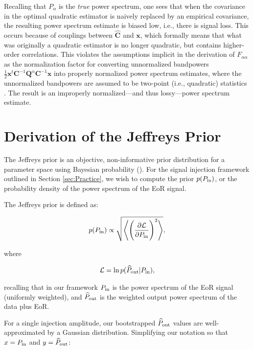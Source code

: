 \documentclass[preprint2,numberedappendix,tighten]{aastex6}  %
\newcommand{\x}{\mathbf{x}}
\newcommand{\C}{\mathbf{C}}
\newcommand{\Q}{\mathbf{Q}}
\begin{document}
Recalling that $P_\alpha$ is the \emph{true} power spectrum, one sees that when the covariance in the optimal quadratic estimator is naively replaced by an empirical covariance, the resulting power spectrum estimate is biased low, i.e., there is signal loss. This occurs because of couplings between $\widehat{\C}$ and $\x$, which formally means that what was originally a quadratic estimator is no longer quadratic, but contains higher-order correlations. This violates the assumptions implicit in the derivation of $F_{\alpha \alpha}$ as the normalization factor for converting unnormalized bandpowers $\frac{1}{2} \x^t \C^{-1} \Q^{\alpha} \C^{-1} \x$ into properly normalized power spectrum estimates, where the unnormalized bandpowers are assumed to be two-point (i.e., quadratic) statistics \citep{liu_tegmark2011}. The result is an improperly normalized---and thus lossy---power spectrum estimate.

\section{Derivation of the Jeffreys Prior}
\label{sec:jeffreys}

The Jeffreys prior is an objective, non-informative prior distribution for a parameter space using Bayesian probability (\citealt{jaynes1968}). For the signal injection framework outlined in Section \ref{sec:Practice}, we wish to compute the prior $p(P_{\rm in})$, or the probability density of the power spectrum of the EoR signal. 

The Jeffreys prior is defined as: 

\begin{equation}
\label{eq:jeffreys}
p(P_{\rm in}) \propto \sqrt {\Bigg\langle \Bigg(\frac{\partial \mathcal{L}}{\partial P_{\rm in}} \Bigg)^{2}\Bigg\rangle},
\end{equation}

\noindent where

\begin{equation}
\label{eq:logprob}
\mathcal{L} = \mathrm{ln} \, p(\widehat{P}_{\rm out} | P_{\rm in}),
\end{equation}

\noindent recalling that in our framework $P_{\rm in}$ is the power spectrum of the EoR signal (uniformly weighted), and $\widehat{P}_{\rm out}$ is the weighted output power spectrum of the data plus EoR.

For a single injection amplitude, our bootstrapped $\widehat{P}_{\rm out}$ values are well-approximated by a Gaussian distribution. Simplifying our notation so that $x = P_{\rm in}$ and $y = \widehat{P}_{\rm out}$:
\end{document}
